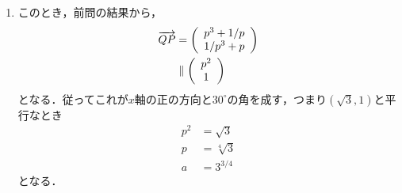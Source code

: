 \documentclass[a4j]{jarticle}
\begin{document}
\begin{multicols}{2}
\begin{enumerate}[(1)]
     \item このとき，前問の結果から，
          \begin{align*}
          \overrightarrow{QP}&=\left( \begin{array}{c} p^3+1/p \\1/p^3+p \\\end{array} \right)  \\
          &\parallel\left( \begin{array}{c} p^2 \\1 \\\end{array} \right)
          \end{align*}
     となる．従ってこれが$x$軸の正の方向と$30^\circ$の角を成す，つまり$(\sqrt{3},1)$と平行なとき
          \begin{align*}
          p^2&=\sqrt{3}　\\
          p&=\sqrt[4]{3} \\
          a&=3^{3/4}\tag{答}
          \end{align*}  
     となる．     
     \end{enumerate}
\newpage
\end{multicols}
\end{document}
